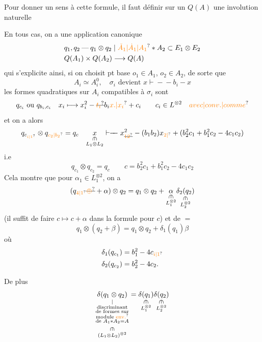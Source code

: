 Pour donner un sens à cette
formule, il faut définir sur un
$Q(A)$ une involution naturelle

En tous cas,  on a
une application canonique
\[
\begin{aligned}
&q_1,q_2\mathbin{\text{---}}q_1\otimes q_2\mid \unsure{\check A_1|\dot A_1|A_1}*A_2\subset E_1\otimes E_2\\
&Q(A_1)\times Q(A_2)\longrightarrow Q(A)
\end{aligned}
\]
qui s'explicite ainsi, si on choisit
 pt base $o_1\in A_1$, $o_2\in A_2$, de sorte
que
\[
A_i\simeq A_i^0,\quad \sigma_i\text{ devient }x\mathrel{\vdash\!\!-\!\!-}b_i-x
\]
les formes quadratiques sur $A_i$ compatibles
à $\sigma_i$ sont
\[
q_{c_i}\text{ ou }q_{b_i,c_i}\quad x_i\longmapsto x_i^2-\deleted{\unsure{t_i}}b_i\unsure{x.|x_i}+c_i
\qquad c_i\in L^{\otimes 2}\quad\unsure{avec|conv.|comme}
\]
et on a alors
\[
q_{c_{\unsure{i|1}}}\otimes q_{\unsure{c_2|b_2}}=q_c\quad
\underset{\substack{\rotatebox{-90}{$\in$}\\L_1\otimes L_2}}{x}
\mathrel{\vdash\!\!-\!\!-}x_{\deleted{\unsure{12}}}^{2}-(b_1b_2)x_{\unsure{2|{}}}+
(b_2^2c_1+b_1^2c_2-4c_1c_2)
\]
i.e
\[
q_{c_1}\otimes q_{c_2}=q_c\qquad c=b_2^2c_1+b_1^2c_2-4c_1c_2
\]
Cela montre que pour $\alpha_1\in L_1^{\otimes 2}$, on a
\[
(q_{\unsure{4|1}}\deleted{\unsure{\oplus}}+\alpha)\otimes q_2=q_1\otimes q_2+
\underset{\substack{\rotatebox{-90}{$\in$}\\L_1^{\otimes 2}}}{\alpha}
\underset{\substack{\rotatebox{-90}{$\in$}\\L_2^{\otimes 2}}}{\delta_2(q_2)}
\]
(il suffit de faire $c\mapsto c+\alpha$ dans la formule
pour $c$) et de $=$ 
\[
q_1\otimes(q_2+\beta)=q_1\otimes q_2+\delta_1(q_1)\beta
\]
où
\[
\begin{aligned}
\delta_1(q_{c_1})&=b_1^2-4c_{\unsure{i|1}}\\
\delta_2(q_{c_2})&=b_2^2-4c_2 .
\end{aligned}
\]

De plus
\[
\underset{\substack{\vert\\\text{discriminant}\\\text{de formes sur}\\\text{module \unsure{env.}}\\\text{de }A_1*A_2=A\\\rotatebox{-90}{$\in$}\\(L_1\otimes L_2)^{\otimes 2}}}{\delta(q_1\otimes q_2)}
=\underset{\substack{\rotatebox{-90}{$\in$}\\L_1^{\otimes 2}}}{\delta(q_1)}
\underset{\substack{\rotatebox{-90}{$\in$}\\L_2^{\otimes 2}}}{\delta(q_2)}
\]

